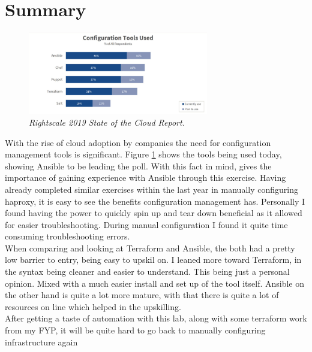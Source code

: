 \section{Summary}
\begin{figure}[!ht]
\centering
\includegraphics*[width=0.7\textwidth]{images/sum1.png}
\caption{\em Rightscale 2019 State of the Cloud Report.}
\label{img:s1}
\end{figure}

With the rise of cloud adoption by companies the need for configuration management tools is significant. Figure \ref{img:s1} shows the tools being used today, showing Ansible to be leading the poll. With this fact in mind, gives the importance of gaining experience with Ansible through this exercise. Having already completed similar exercises within the last year in manually configuring haproxy, it is easy to see the benefits configuration management has. Personally I found having the power to quickly spin up and tear down beneficial as it allowed for easier troubleshooting. During manual configuration I found it quite time consuming troubleshooting errors.
\\When comparing and looking at Terraform and Ansible, the both had a pretty low barrier to entry, being easy to upskil on. I leaned more toward Terraform, in the syntax being cleaner and easier to understand. This being just a personal opinion. Mixed with a much easier install and set up of the tool itself. Ansible on the other hand is quite a lot more mature, with that there is quite a lot of resources on line which helped in the upskilling.
\\After getting a taste of automation with this lab, along with some terraform work from my FYP, it will be quite hard to go back to manually configuring infrastructure again